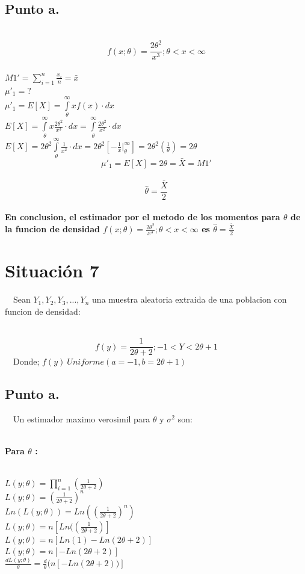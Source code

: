 \documentclass[letterpaper,12pt,onecolumn,titlepage]{article}
\begin{document}
\subsection{Punto a.}
~\\ $$f(x;\theta) = \frac{2\theta^2}{x^3} ; \theta<x<\infty $$
~\\ $M1'=\sum_{i=1}^{n}\frac{x_{i}}{n}=\bar{x}$
~\\ $\mu'_1 =?$
~\\ $\mu'_1=E[X]= \int \limits_{\theta}^{\infty} x f(x) \cdot dx$
~\\ $E[X]=\int \limits_{\theta}^{\infty} x \frac{2\theta^2}{x^3}\cdot dx=\int \limits_{\theta}^{\infty}\frac{2\theta^2}{x^2}\cdot dx$
~\\ $E[X]=2\theta^2 \int \limits_{\theta}^{\infty}\frac{1}{x^2}\cdot dx= 2\theta^2[-\frac{1}{x}|_{\theta}^{\infty}]=2\theta^2(\frac{1}{\theta})=2\theta$
~\\ $$\mu'_1=E[X]=2\theta=\bar{X}=M1'$$
~\ $$\hat{\theta}=\frac{\bar{X}}{2}$$
~\\ \textbf{En conclusion, el estimador por el metodo de los momentos para $\theta$ de la funcion de densidad $f(x;\theta) = \frac{2\theta^2}{x^3} ; \theta<x<\infty $ es $\hat{\theta}=\frac{\bar{X}}{2}$}


\pagebreak\section{Situaci\'{o}n 7}
~\ Sean $Y_{1}, Y_{2}, Y_{3},...,Y_{n}$ una muestra aleatoria extraida de una poblacion con funcion de densidad:

~\ $$f({y})= \frac{1}{2\theta +2}  ;  -1<Y<2\theta+1$$
~\ Donde; $f({y}) ~ Uniforme(a=-1,b=2\theta+1)$

\subsection{Punto a.}
~\ Un estimador maximo verosimil para $\theta$ y $\sigma^{2}$ son:

~\\ \textbf{Para $\theta$ :}

~\\ $L(y;\theta) = \prod_{i=1}^n{}(\frac{1}{2\theta +2})$
~\\ $L(y;\theta) = (\frac{1}{2\theta +2})^{n}$
~\\ $Ln(L(y;\theta)) = Ln((\frac{1}{2\theta +2})^{n})$
~\\ $L(y;\theta) = n[Ln((\frac{1}{2\theta +2})]$
~\\ $L(y;\theta) = n[Ln(1)-Ln({2\theta+2})]$
~\\ $L(y;\theta) = n[-Ln({2\theta+2})]$
~\\ $\frac{dL(y;\theta)}{\theta} = \frac{d}{\theta}(n[-Ln({2\theta+2}))]$
\end{document}
